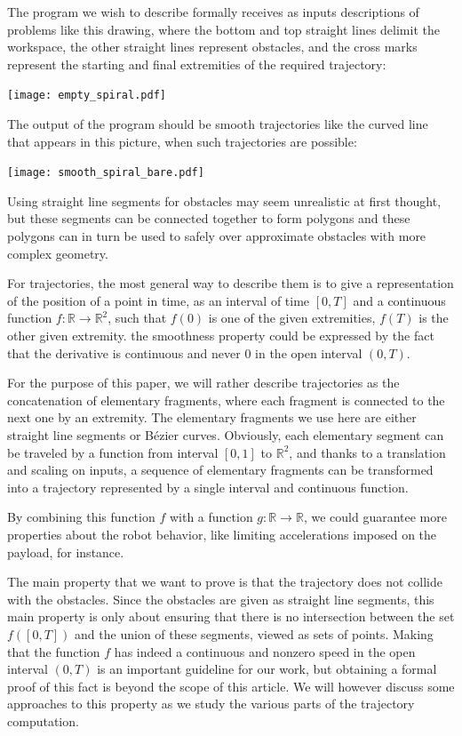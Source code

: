 \documentclass{llncs}
\begin{document}
The program we wish to describe formally receives as inputs
descriptions of problems like this drawing, where the bottom and top
straight lines delimit the workspace, the other straight lines
represent obstacles, and the cross marks represent the starting and
final extremities of the required trajectory:
\begin{center}
\texttt{[image: empty\_spiral.pdf]}
\end{center}
The output of the program should be smooth trajectories like the curved
line that appears in this picture, when such trajectories are possible:
\begin{center}
\texttt{[image: smooth\_spiral\_bare.pdf]}
\end{center}
Using straight line segments for obstacles may seem unrealistic at
first thought, but these segments can be connected together to form
polygons and these polygons can in turn be used to safely
over approximate obstacles with more complex geometry.

For trajectories, the most general way to describe them is to
give a representation of the position of a point in time,
as an interval of time \([0, T]\) and a continuous function \(f : {\mathbb R}
\rightarrow {\mathbb R}^2\), such that \(f(0)\) is one of the given
extremities, \(f(T)\) is the other given extremity.  the smoothness property
could be expressed by the fact that the derivative is continuous and
never 0 in the open interval \((0,T)\).

For the purpose of this
paper, we will rather describe trajectories as the concatenation of
elementary fragments, where each fragment is connected to the next one
by an extremity.  The elementary fragments we use here are either
straight line segments or Bézier curves.  Obviously, each elementary
segment can be traveled by a function from interval \([0,1]\) to
\({\mathbb R}^2\), and thanks to a translation and scaling on inputs,
a sequence of elementary fragments can be transformed into a
trajectory represented by a single interval and continuous function.

By combining this function \(f\) with a function \(g: {\mathbb R}
\rightarrow {\mathbb R}\), we could guarantee more properties about
the robot behavior, like limiting accelerations imposed on the
payload, for instance.

The main property that we want to prove is that the trajectory does
not collide with the obstacles.  Since the obstacles are given as
straight line segments, this main property is only about ensuring that
there is no intersection between the set \(f([0,T])\) and the union of
these segments, viewed as sets of points.  Making that the function
\(f\) has indeed a continuous and nonzero speed in the open interval
\((0,T)\) is an important guideline for our work, but obtaining a formal
proof of this fact is beyond the scope of this article.  We will
however discuss some approaches to this property as we study the
various parts of the trajectory computation.
\end{document}
